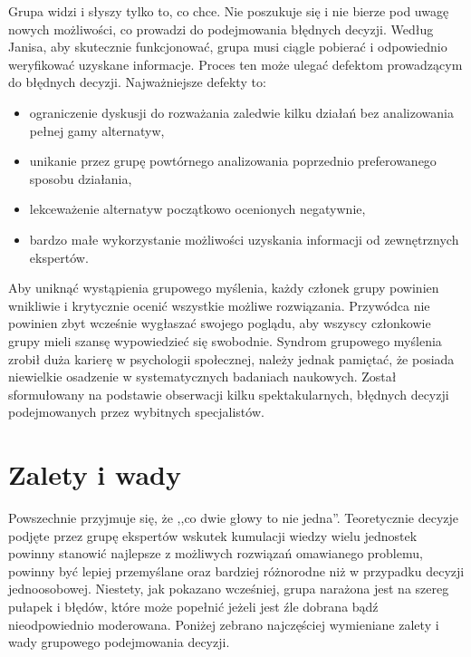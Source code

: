 Grupa widzi i słyszy tylko to, co chce. Nie poszukuje się i nie bierze pod uwagę 
nowych możliwości, co prowadzi do podejmowania błędnych decyzji. Według Janisa, 
aby skutecznie funkcjonować, grupa musi ciągle pobierać i odpowiednio
weryfikować uzyskane informacje. Proces ten może ulegać defektom prowadzącym do
błędnych decyzji. Najważniejsze defekty to:

\begin{itemize}
  \item ograniczenie dyskusji do rozważania zaledwie kilku działań bez
  analizowania pełnej gamy alternatyw,
  \item unikanie przez grupę powtórnego analizowania poprzednio preferowanego
  sposobu działania,
  \item lekceważenie alternatyw początkowo ocenionych negatywnie,
  \item bardzo małe wykorzystanie możliwości uzyskania informacji od
  zewnętrznych ekspertów.
\end{itemize}

Aby uniknąć wystąpienia grupowego myślenia, każdy członek grupy powinien
wnikliwie i krytycznie ocenić wszystkie możliwe rozwiązania. Przywódca nie
powinien zbyt wcześnie wygłaszać swojego poglądu, aby wszyscy członkowie gru\-py
mie\-li szan\-sę wypowiedzieć się swobodnie. Syndrom grupowego myślenia zrobił
duża karierę w psychologii społecznej, należy jednak pamiętać, że posiada niewielkie
osadzenie w systematycznych badaniach naukowych. Został sformułowany na
podstawie obserwacji kilku spektakularnych, błędnych decyzji podejmowanych przez
wybitnych specjalistów.

\section{Zalety i wady}
Powszechnie przyjmuje się, że ,,co dwie głowy to nie jedna''. Teoretycznie
decyzje podjęte przez grupę ekspertów wskutek kumulacji wiedzy wielu jednostek 
powinny stanowić najlepsze z możliwych rozwiązań omawianego problemu, powinny
być lepiej przemyślane oraz bardziej różnorodne niż w przypadku decyzji
jednoosobowej. Niestety, jak pokazano wcześniej, grupa narażona jest na szereg
pułapek i błędów, które może popełnić jeżeli jest źle dobrana bądź
nieodpowiednio moderowana. Poniżej zebrano najczęściej wymieniane
\cite{Wegner1986} zalety i wady grupowego podejmowania decyzji.

